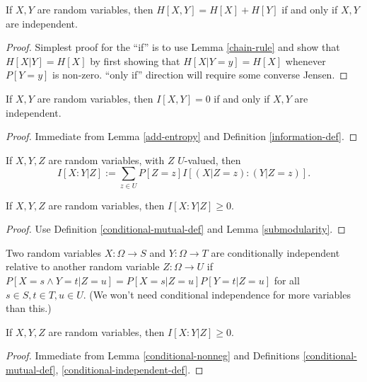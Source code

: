 \begin{lemma}\label{add-entropy}   If $X,Y$ are random variables, then $H[X,Y] = H[X] + H[Y]$ if and only if $X,Y$ are independent.
\end{lemma}

\begin{proof} Simplest proof for the ``if'' is to use Lemma \ref{chain-rule} and show that $H[X|Y] = H[X]$ by first showing that $H[X|Y=y] = H[X]$ whenever $P[Y=y]$ is non-zero.  ``only if'' direction will require some converse Jensen.
\end{proof}


\begin{corollary}\label{vanish-entropy}  If $X,Y$ are random variables, then $I[X,Y] = 0$ if and only if $X,Y$ are independent.
\end{corollary}

\begin{proof} Immediate from Lemma \ref{add-entropy} and Definition \ref{information-def}.
\end{proof}

\begin{definition}\label{conditional-mutual-def}   If $X,Y,Z$ are random variables, with $Z$ $U$-valued, then
  $$ I[X:Y|Z] := \sum_{z \in U} P[Z=z] I[(X|Z=z): (Y|Z=z)].$$
\end{definition}

\begin{lemma}\label{conditional-nonneg}   
If $X,Y,Z$ are random variables, then $I[X:Y|Z] \ge 0$.
\end{lemma}

\begin{proof} Use Definition \ref{conditional-mutual-def} and Lemma \ref{submodularity}.
\end{proof}

\begin{definition}\label{conditional-independent-def}
  Two random variables $X: \Omega \to S$ and $Y: \Omega \to T$ are conditionally independent relative to another random variable $Z: \Omega \to U$ if $P[ X = s \wedge Y = t| Z=u] = P[X=s|Z=u] P[Y=t|Z=u]$ for all $s \in S, t \in T, u \in U$.  (We won't need conditional independence for more variables than this.)
\end{definition}

\begin{lemma}\label{conditional-vanish}   
  If $X,Y,Z$ are random variables, then $I[X:Y|Z] \ge 0$.
\end{lemma}

\begin{proof} Immediate from Lemma \ref{conditional-nonneg} and Definitions \ref{conditional-mutual-def}, \ref{conditional-independent-def}.
\end{proof}

